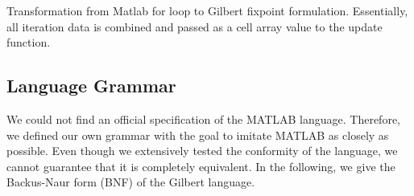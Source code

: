 \begin{listing}
  \centering
  \caption{Transformation from Matlab for loop  to Gilbert fixpoint  formulation. Essentially, all iteration data is combined and passed as a cell array value to the update function.}
  \label{fig:for2Fixpoint}
\end{listing}

\subsection{Language Grammar}
\label{sec:languageGrammar}

We could not find an official specification of the MATLAB language.
Therefore, we defined our own grammar with the goal to imitate MATLAB as closely as possible.
Even though we extensively tested the conformity of the language, we cannot guarantee that it is completely equivalent.
In the following, we give the Backus-Naur form (BNF) of the Gilbert language.

